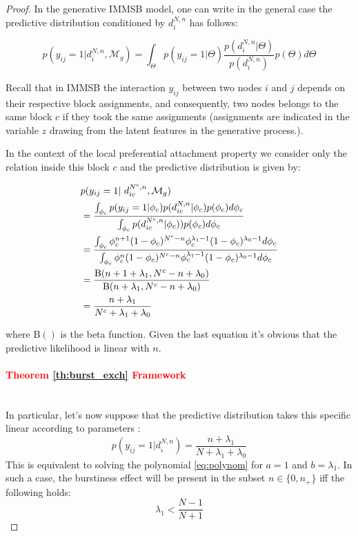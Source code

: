 \begin{proof}
In the generative IMMSB model, one can write in the general case the predictive distribution conditioned by $d_i^{N,n}$ has follows:

\begin{equation} 
p(y_{ij} = 1 | d_i^{N,n}, \mathcal{M}_g) = \int_{\Theta} p(y_{ij}=1|\Theta) \frac{p(d_i^{N,n} | \Theta)}{p(d_i^{N,n})} p(\Theta) d\Theta \nonumber
\end{equation}

Recall that in IMMSB the interaction $y_{ij}$ between two nodes $i$ and $j$ depends on their respective block assignments, and consequently, two nodes belongs to the same block $c$ if they took the same assignments (assignments are indicated in the variable $z$ drawing from the latent features in the generative process.).

In the context of the local preferential attachment property we consider only the relation inside this block $c$ and the predictive distribution is given by:

\begin{align*} \label{eq:sum}
&p(y_{ij} = 1 | d_{ic}^{N^c,n}, \mathcal{M}_g)  \\
&=  \frac{ \int_{\phi_{c}} p(y_{ij}=1|\phi_{c}) p(d_{ic}^{N,n} | \phi_{c}) p(\phi_{c}) d\phi_{c}}{\int_{\phi_{c}} \p(d_{ic}^{N^c,n} | \phi_{c}))       p(\phi_{c}) d\phi_{c}}   \\
&= \frac{\int_{\phi_c} \phi_c^{n+1}(1-\phi_c)^{N^c-n} \phi_c^{\lambda_1-1} (1-\phi_c)^{\lambda_0-1} d\phi_{c}}{\int_{\phi_c} \phi_c^{n}(1-\phi_c)^{N^c-n} \phi_c^{\lambda_1-1} (1-\phi_c)^{\lambda_0-1} d\phi_{c}} \\
&= \frac{ \text{B}(n+1+\lambda_1, N^c-n+\lambda_0) }{\text{B}(n+\lambda_1, N^c-n+\lambda_0)} \\
&= \frac{n+\lambda_1}{N^c + \lambda_1 +\lambda_0}
\end{align*}

where $\text{B}()$ is the beta function. Given the last equation it's obvious that the  predictive likelihood is linear with $n$.

    \paragraph{\textcolor{red}{Theorem \ref{th:burst_exch} Framework }}~\\

In particular,  let's now suppose that the predictive distribution takes this specific linear according to parameters :
\begin{equation*}
p(y_{ij}=1 | d_i^{N,n}) = \frac{n+\lambda_1}{N+\lambda_1+\lambda_0}
\end{equation*}
    This is equivalent to solving the polynomial \eqref{eq:polynom} for $a=1$ and $b=\lambda_1$. In such a case, the burstiness effect will be present in the subset $n \in \{0, n_+\}$ iff the following holds:
\begin{equation*}
\lambda_1 < \frac{N-1}{N+1}
\end{equation*}


\end{proof}
